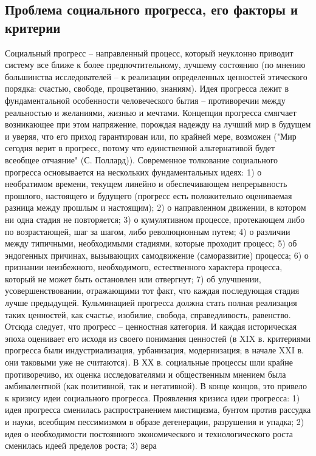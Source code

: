 \documentclass[12pt]{article}
\begin{document}
\subsection{Проблема социального прогресса, его факторы и критерии}
Социальный прогресс – направленный процесс, который неуклонно приводит систему все ближе к более
предпочтительному, лучшему состоянию (по мнению большинства исследователей – к реализации
определенных ценностей этического порядка: счастью, свободе, процветанию, знаниям).
Идея прогресса лежит в фундаментальной особенности человеческого бытия – противоречии между
реальностью и желаниями, жизнью и мечтами. Концепция прогресса смягчает возникающее при этом
напряжение, порождая надежду на лучший мир в будущем и уверяя, что его приход гарантирован или, по
крайней мере, возможен ("Мир сегодня верит в прогресс, потому что единственной альтернативой будет
всеобщее отчаяние" (С. Поллард)).
Современное толкование социального прогресса основывается на нескольких фундаментальных идеях: 1) о
необратимом времени, текущем линейно и обеспечивающем непрерывность прошлого, настоящего и будущего
(прогресс есть положительно оцениваемая разница между прошлым и настоящим); 2) о направленном
движении, в котором ни одна стадия не повторяется; 3) о кумулятивном процессе, протекающем либо по
возрастающей, шаг за шагом, либо революционным путем; 4) о различии между типичными, необходимыми
стадиями, которые проходит процесс; 5) об эндогенных причинах, вызывающих самодвижение (саморазвитие)
процесса; 6) о признании неизбежного, необходимого, естественного характера процесса, который не может
быть остановлен или отвергнут; 7) об улучшении, усовершенствовании, отражающими тот факт, что каждая
последующая стадия лучше предыдущей.
Кульминацией прогресса должна стать полная реализация таких ценностей, как счастье, изобилие, свобода,
справедливость, равенство. Отсюда следует, что прогресс – ценностная категория. И каждая историческая эпоха
оценивает его исходя из своего понимания ценностей (в XIX в. критериями прогресса были индустриализация,
урбанизация, модернизация; в начале XXI в. они таковыми уже не считаются).
В ХХ в. социальные процессы шли крайне противоречиво, их оценка исследователями и общественным
мнением была амбивалентной (как позитивной, так и негативной). В конце концов, это привело к кризису идеи
социального прогресса.
Проявления кризиса идеи прогресса: 1) идея прогресса сменилась распространением мистицизма, бунтом
против рассудка и науки, всеобщим пессимизмом в образе дегенерации, разрушения и упадка; 2) идея о
необходимости постоянного экономического и технологического роста сменилась идеей пределов роста; 3) вера
\end{document}

